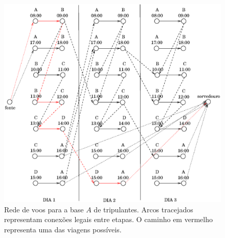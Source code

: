 \begin{figure}[htbp]
	\begin{center}
		\includegraphics[scale=0.65]{fig/rede.eps}
		\caption{Rede de voos para a base $A$ de tripulantes. Arcos tracejados representam conexões 
		legais entre etapas. O caminho em vermelho representa uma das viagens possíveis.}
		\label{fig:rede}
	\end{center}
\end{figure}

